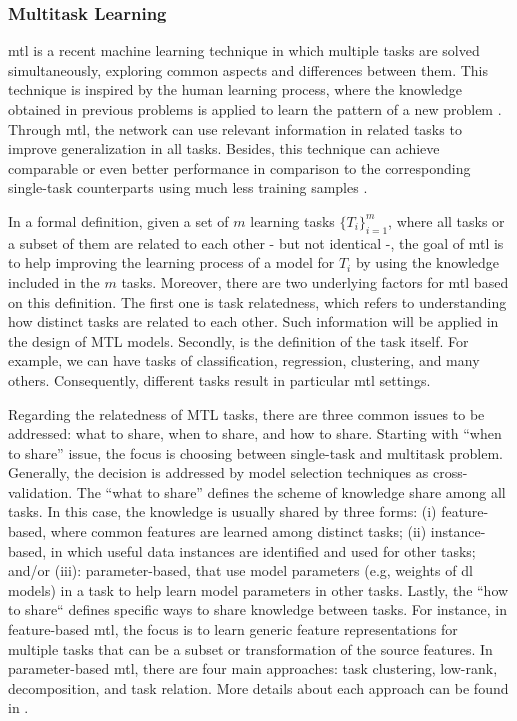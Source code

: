 \subsubsection{Multitask Learning}

\acf{mtl} is a recent machine learning technique in which multiple tasks are solved simultaneously, exploring common aspects and differences between them. This technique is inspired by the human learning process, where the knowledge obtained in previous problems is applied to learn the pattern of a new problem \citep{zhang2017survey}. Through \acs{mtl}, the network can use relevant information in related tasks to improve generalization in all tasks. Besides, this technique can achieve comparable or even better performance in comparison to the corresponding single-task counterparts using much less training samples \citep{domhan2017using, singla2018multi}.

In a formal definition, given a set of $m$ learning tasks $\{T_i\}_{i=1}^m$, where all tasks or a subset of them are related to each other - but not identical -, the goal of \acs{mtl} is to help improving the learning process of a model for $T_i$ by using the knowledge included in the $m$ tasks. Moreover, there are two underlying factors for \acs{mtl} based on this definition. The first one is task relatedness, which refers to understanding how distinct tasks are related to each other. Such information will be applied in the design of MTL models. Secondly, is the definition of the task itself. For example, we can have tasks of classification, regression, clustering, and many others. Consequently, different tasks result in particular \acs{mtl} settings.

Regarding the relatedness of MTL tasks, there are three common issues to be addressed: what to share, when to share, and how to share. Starting with ``when to share'' issue, the focus is choosing between single-task and multitask problem. Generally, the decision is addressed by model selection techniques as cross-validation. The ``what to share'' defines the scheme of knowledge share among all tasks. In this case, the knowledge is usually shared by three forms: (i) feature-based, where common features are learned among distinct tasks; (ii) instance-based, in which useful data instances are identified and used for other tasks; and/or (iii): parameter-based, that use model parameters (e.g, weights of \acl{dl} models) in a task to help learn model parameters in other tasks. Lastly, the ``how to share`` defines specific ways to share knowledge between tasks. For instance, in feature-based \acs{mtl}, the focus is to learn generic feature representations for multiple tasks that can be a subset or transformation of the source features. In parameter-based \acs{mtl}, there are four main approaches: task clustering, low-rank, decomposition, and task relation. More details about each approach can be found in \citep{zhang2017survey}.

